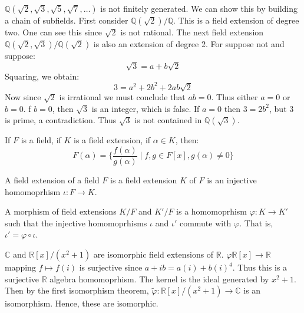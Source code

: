 \documentclass{article}                                                        %
\begin{document}
        \begin{example}
            $\mathbb{Q}(\sqrt{2},\sqrt{3},\sqrt{5},\sqrt{7},\dots)$ is not
            finitely generated. We can show this by building a chain of
            subfields. First consider $\mathbb{Q}(\sqrt{2})/\mathbb{Q}$. This
            is a field extension of degree two. One can see this since
            $\sqrt{2}$ is not rational. The next field extension
            $\mathbb{Q}(\sqrt{2},\sqrt{3})/\mathbb{Q}(\sqrt{2})$ is also an
            extension of degree 2. For suppose not and suppose:
            \begin{equation}
                \sqrt{3}=a+b\sqrt{2}
            \end{equation}
            Squaring, we obtain:
            \begin{equation}
                3=a^{2}+2b^{2}+2ab\sqrt{2}
            \end{equation}
            Now since $\sqrt{2}$ is irrational we must conclude that $ab=0$.
            Thus either $a=0$ or $b=0$. f $b=0$, then $\sqrt{3}$ is an integer,
            which is false. If $a=0$ then $3=2b^{2}$, but $3$ is prime, a
            contradiction. Thus $\sqrt{3}$ is not contained in
            $\mathbb{Q}(\sqrt{3})$.
        \end{example}
        \begin{theorem}
            If $F$ is a field, if $K$ is a field extension, if $\alpha\in{K}$,
            then:
            \begin{equation}
                F(\alpha)=\big\{\frac{f(\alpha)}{g(\alpha)}\;|\;
                    f,g\in{F}[x],g(\alpha)\ne{0}\big\}
            \end{equation}
        \end{theorem}
        \begin{theorem}
            A field extension of a field $F$ is a field extension $K$ of $F$
            is an injective homomoprhism $\iota:F\rightarrow{K}$.
        \end{theorem}
        \begin{definition}
            A morphism of field extensions $K/F$ and $K'/F$ is a homomoprhism
            $\varphi:K\rightarrow{K}'$ such that the injective homomoprhisms
            $\iota$ and $\iota'$ commute with $\varphi$. That is,
            $\iota'=\varphi\circ\iota$.
        \end{definition}
        \begin{example}
            $\mathbb{C}$ and $\mathbb{R}[x]/(x^{2}+1)$ are isomorphic field
            extensions of $\mathbb{R}$.
            $\varphi\mathbb{R}[x]\rightarrow\mathbb{R}$ mapping
            $f\mapsto{f}(i)$ is surjective since $a+ib=a(i)+b(i)^{4}$. Thus this
            is a surjective $\mathbb{R}$ algebra homomoprhism. The kernel is
            the ideal generated by $x^{2}+1$. Then by the first isomorphism
            theorem,
            $\tilde{\varphi}:\mathbb{R}[x]/(x^{2}+1)\rightarrow\mathbb{C}$ is an
            isomorphism. Hence, these are isomorphic.
        \end{example}
\end{document}
